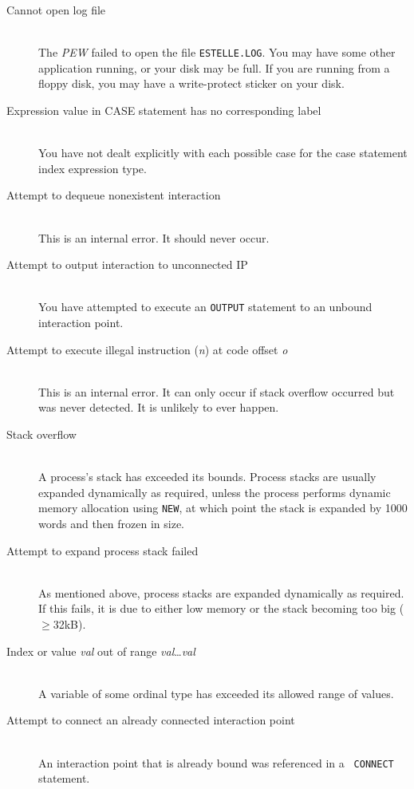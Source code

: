 \begin{description}
\item[Cannot open log file]\mbox{}\\
The {\em PEW} failed to open the file {\tt ESTELLE.LOG}. You may
have some other application running, or your disk may be full. If you
are running from a floppy disk, you may have a write-protect sticker
on your disk.

\item[Expression value in CASE statement has no corresponding label]\mbox{}\\
You have not dealt explicitly with each possible case for the case
statement index expression type. 

\item[Attempt to dequeue nonexistent interaction]\mbox{}\\
This is an internal error. It should never occur.

\item[Attempt to output interaction to unconnected IP]\mbox{}\\
You have attempted to execute an {\tt OUTPUT} statement to an
unbound interaction point.

\item[Attempt to execute illegal instruction ({\em n}) at code offset {\em o}]\mbox{}\\
This is an internal error. It can only occur if stack overflow
occurred but was never detected. It is unlikely to ever happen.

\item[Stack overflow]\mbox{}\\
A process's stack has exceeded its bounds. Process stacks are
usually expanded dynamically as required, unless the process performs
dynamic memory allocation using {\tt NEW}, at which point the stack
is expanded by 1000 words and then frozen in size.

\item[Attempt to expand process stack failed]\mbox{}\\
As mentioned above, process stacks are expanded dynamically as
required. If this fails, it is due to either low memory or the stack
becoming too big ($\geq$32kB).

\item[Index or value {\em val} out of range {\em val}\dots{\em val}]\mbox{}\\
A variable of some ordinal type has exceeded its allowed range of
values.

\item[Attempt to connect an already connected interaction point]\mbox{}\\
An interaction point that is already bound was referenced in a {\tt
CONNECT} statement.


\end{description}
